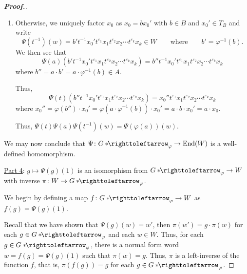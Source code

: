 \documentclass[11pt,a4paper,reqno]{amsart}
\theoremstyle{plain}
\theoremstyle{definition}
\theoremstyle{definition}
\newenvironment{myproof}{\begin{proof}[\normalfont\bfseries Proof.]}{\end{proof}}
\newcommand\hnn{*\!\!\righttoleftarrow}
\begin{document}
\begin{myproof}
\begin{enumerate}[label=\alph*)]
		\item Otherwise, we uniquely factor $x_0$ as $x_0 = b x_0'$ with $b\in B$ and $x_0'\in T_B$ and write
		      \[
			      \Psi(t^{-1})(w)
			      =
			      b' t^{-1} x_0' t^{\varepsilon_1} x_1 t^{\varepsilon_2} x_2 \cdots t^{\varepsilon_k} x_k \in W
			      \qquad
			      \text{where}
			      \qquad
			      b'=\varphi^{-1}(b).
		      \]
		      We then see that
		      \[
			      \Psi(a)(b' t^{-1} x_0' t^{\varepsilon_1} x_1 t^{\varepsilon_2} x_2 \cdots t^{\varepsilon_k} x_k)
			      =
			      b'' t^{-1} x_0' t^{\varepsilon_1} x_1 t^{\varepsilon_2} x_2 \cdots t^{\varepsilon_k} x_k
		      \]
		      where $b'' =a\cdot b'= a\cdot \varphi^{-1}(b)\in A$.

		      Thus,
		      \[
			      \Psi(t)(b'' t^{-1} x_0' t^{\varepsilon_1} x_1 t^{\varepsilon_2} x_2 \cdots t^{\varepsilon_k} x_k)
			      =
			      x_0'' t^{\varepsilon_1} x_1 t^{\varepsilon_2} x_2 \cdots t^{\varepsilon_k} x_k
		      \]
		      where $x_0'' = \varphi(b'')\cdot x_0' = \varphi(a\cdot \varphi^{-1}(b))\cdot x_0' = a\cdot b \cdot x_0' = a\cdot x_0$.

		      Thus, $\Psi(t)\Psi(a)\Psi(t^{-1}) (w) = \Psi(\varphi(a))(w)$.
	\end{enumerate}
	We may now conclude that $\Psi\colon G\hnn_\varphi \to \mathrm{End}(W)$ is a well-defined homomorphism.

	\medskip
	\noindent
	\underline{Part 4}: $g\mapsto \Psi(g)(1)$ is an isomorphism from $G\hnn_\varphi\to W$ with inverse $\pi\colon W\to G\hnn_\varphi$.

	\smallskip
	\noindent
	We begin by defining a map $f\colon G\hnn_\varphi\to W$ as $f(g) = \Psi(g)(1)$.

	Recall that we have shown that $\Psi(g)(w)=w'$, then $\pi(w') = g\cdot \pi(w)$ for each $g\in G\hnn_\varphi$ and each $w\in W$.
	Thus, for each $g\in G\hnn_\varphi$, there is a normal form word $w =f(g)= \Psi(g)(1)$ such that $\pi(w)=g$.
	Thus, $\pi$ is a left-inverse of the function $f$, that is, $\pi(f(g))=g$ for each $g\in G\hnn_\varphi$.


\end{myproof}
\end{document}
